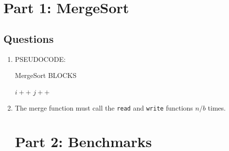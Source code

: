 \documentclass[../main.tex]{subfiles}
\begin{document}
\pagestyle{fancy}


\renewcommand{\thefigure}{\arabic{figure}}
\section*{Part 1: MergeSort}

\subsection*{Questions}

\begin{enumerate}
    \item PSEUDOCODE:
    \begin{algorithm}
        \caption{MergeSort BLOCKS}
        \begin{algorithmic}[1]
                \State $i++$
                    \State {}
                \EndIf
            \EndProcedure
                \State $j++$
                    \State {}
                \EndIf
            \EndProcedure
        \end{algorithmic}
    \end{algorithm}

    \item The merge function must call the \texttt{read} and \texttt{write} functions
    $n/b$ times. 

    \section*{Part 2: Benchmarks}


\end{enumerate}
\end{document}
